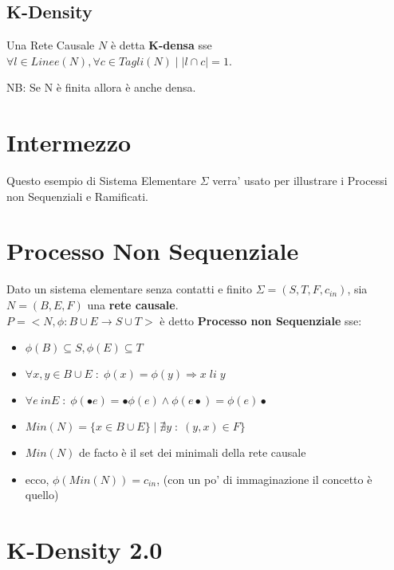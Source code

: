 \subsection{K-Density}

Una Rete Causale $N$ \`e detta \textbf{K-densa} sse $\forall l \in Linee(N), \forall c \in Tagli(N) \; | \; |l \cap c| = 1$.

NB: Se N \`e finita allora \`e anche densa.

\section{Intermezzo}

Questo esempio di Sistema Elementare $\Sigma$ verra' usato per illustrare i Processi non Sequenziali e Ramificati.


\section{Processo Non Sequenziale}

Dato un sistema elementare senza contatti e finito $\Sigma = (S, T, F, c_{in})$, sia $N = (B, E, F)$ una \textbf{rete causale}. \\

$P = <N, \phi : B \cup E \rightarrow S \cup T>$ \`e detto \textbf{Processo non Sequenziale} sse:

\begin{itemize}
    \item $\phi(B) \subseteq S, \phi(E) \subseteq T$
    \item $\forall x,y \in B \cup E \; : \; \phi(x) = \phi(y) \Rightarrow x \; li \; y$
    \item $\forall e \ in E \; : \; \phi(\bullet e) = \bullet \phi(e) \land  \phi(e \bullet) = \phi(e) \bullet$
    \item $Min(N) = \{ x \in B \cup E \} \; | \; \nexists y \; : \; (y, x) \in F \}$
    \item $Min(N)$ de facto \`e il set dei minimali della rete causale
    \item ecco, $\phi(Min(N)) = c_{in}$, (con un po' di immaginazione il concetto \`e quello)
\end{itemize}


\section{K-Density 2.0}

